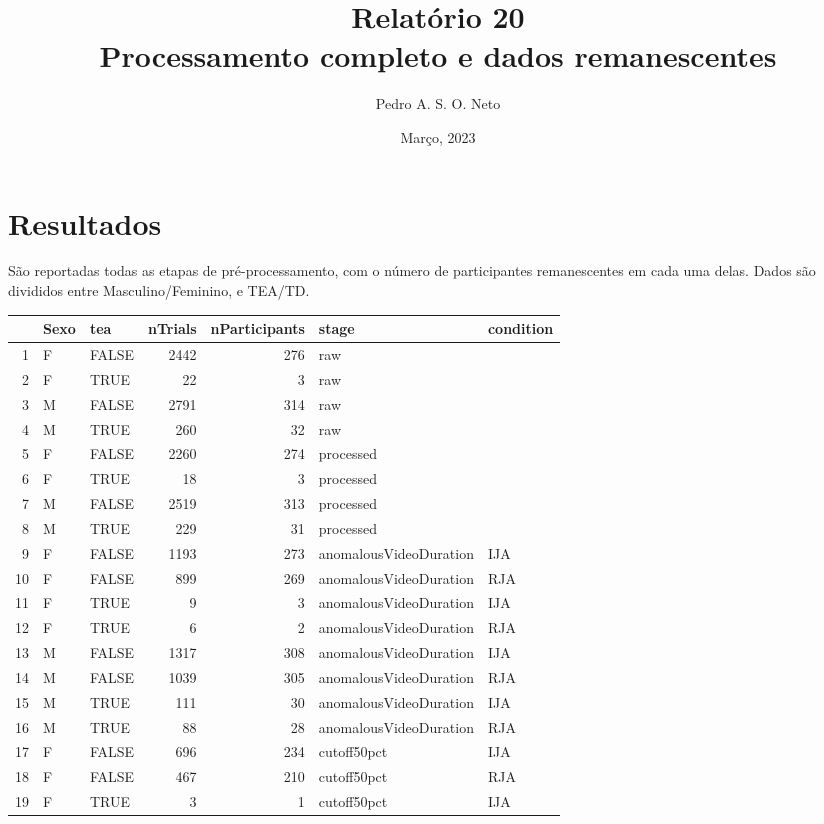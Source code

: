 \documentclass{article}
\title{Relatório 20 \\ Processamento completo e dados remanescentes}
\author{Pedro A. S. O. Neto}
\date{Março, 2023}
\begin{document}
\maketitle

\section{Resultados}

São reportadas todas as etapas de pré-processamento, com o número de participantes remanescentes em cada uma delas. Dados são divididos entre Masculino/Feminino, e TEA/TD.
\begin{table}[ht]
\centering
\begin{tabular}{rllrrll}
  \hline
 & Sexo & tea & nTrials & nParticipants & stage & condition \\ 
  \hline
1 & F & FALSE & 2442 & 276 & raw &  \\ 
  2 & F & TRUE &  22 &   3 & raw &  \\ 
  3 & M & FALSE & 2791 & 314 & raw &  \\ 
  4 & M & TRUE & 260 &  32 & raw &  \\ 
  5 & F & FALSE & 2260 & 274 & processed &  \\ 
  6 & F & TRUE &  18 &   3 & processed &  \\ 
  7 & M & FALSE & 2519 & 313 & processed &  \\ 
  8 & M & TRUE & 229 &  31 & processed &  \\ 
  9 & F & FALSE & 1193 & 273 & anomalousVideoDuration & IJA \\ 
  10 & F & FALSE & 899 & 269 & anomalousVideoDuration & RJA \\ 
  11 & F & TRUE &   9 &   3 & anomalousVideoDuration & IJA \\ 
  12 & F & TRUE &   6 &   2 & anomalousVideoDuration & RJA \\ 
  13 & M & FALSE & 1317 & 308 & anomalousVideoDuration & IJA \\ 
  14 & M & FALSE & 1039 & 305 & anomalousVideoDuration & RJA \\ 
  15 & M & TRUE & 111 &  30 & anomalousVideoDuration & IJA \\ 
  16 & M & TRUE &  88 &  28 & anomalousVideoDuration & RJA \\ 
  17 & F & FALSE & 696 & 234 & cutoff50pct & IJA \\ 
  18 & F & FALSE & 467 & 210 & cutoff50pct & RJA \\ 
  19 & F & TRUE &   3 &   1 & cutoff50pct & IJA \\ 

\end{tabular}
\end{table}
\end{document}
